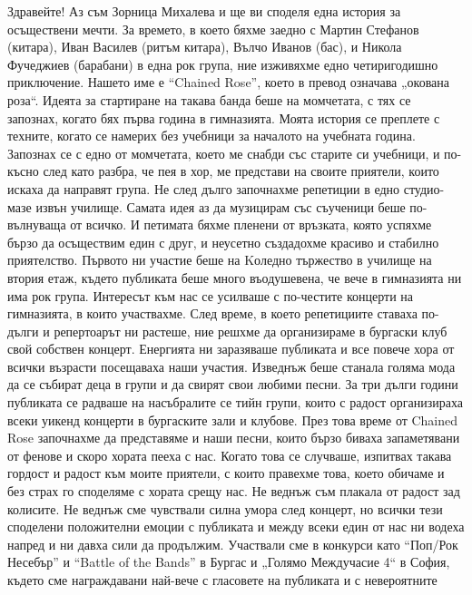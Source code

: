 \begin{multicols}{3}
Здравейте! Аз съм Зорница Михалева и ще ви споделя една история за осъществени 
мечти. За времето, в което бяхме заедно с Мартин Стефанов (китара), Иван Василев 
(ритъм китара), Вълчо Иванов (бас), и Никола Фучеджиев (барабани) в една рок 
група, ние изживяхме едно четиригодишно приключение. 
Нашето име е  “Chained Rose”, което в превод означава „окована роза“. Идеята за 
стартиране на такава банда беше на момчетата, с тях се запознах, когато бях 
първа година в гимназията. Моята история се преплете с техните, когато се 
намерих без учебници за началото на учебната година. Запознах се с едно от 
момчетата, което ме снабди със старите си учебници, и по-късно след като разбра, 
че пея в хор, ме представи на своите приятели, които искаха да направят група. 
Не след дълго започнахме репетиции в едно студио-мазе извън училище. Самата идея 
аз да музицирам със съученици беше по-вълнуваща от всичко. И петимата бяхме 
пленени от връзката, която успяхме бързо да осъществим един с друг, и неусетно 
създадохме красиво и стабилно приятелство. Първото ни участие беше на Kоледно 
тържество в училище на втория етаж, където публиката беше много въодушевена, че 
вече в гимназията ни има рок група. Интересът към нас се усилваше с по-честите 
концерти на гимназията, в които участвахме. След време, в което репетициите 
ставаха по-дълги и репертоарът ни растеше, ние решхме да организираме в бургаски 
клуб свой собствен концерт. Енергията ни заразяваше публиката и все повече хора 
от всички възрасти посещаваха наши участия. Изведнъж беше станала голяма мода да 
се събират деца в групи и да свирят свои любими песни. За три дълги години 
публиката се радваше на насъбралите се тийн групи, които с радост организираха 
всеки уикенд концерти в бургаските зали и клубове. През това време от Chained 
Rose започнахме да представяме и наши песни, които бързо биваха запаметявани от 
фенове и скоро хората пееха с нас. Когато това се случваше, изпитвах такава 
гордост и радост към моите приятели, с които правехме това, което обичаме и без 
страх го споделяме с хората срещу нас. Не веднъж съм плакала от радост зад 
колисите. Не веднъж сме чувствали силна умора след концерт, но всички тези 
споделени положителни емоции с публиката и между всеки един от нас ни водеха 
напред и ни давха сили да продължим. Участвали сме в конкурси като “Поп/Рок 
Несебър” и “Battle of the Bands” в Бургас и „Голямо Междучасие 4“ в София, 
където сме награждавани най-вече с гласовете на публиката и с невероятните 

\end{multicols}
